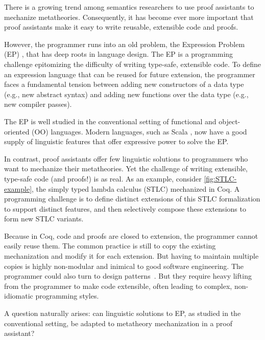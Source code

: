 
There is a growing trend among semantics researchers to
use proof assistants to mechanize meta\-theories.
Consequently, it has become ever more important that proof assistants
make it easy to write reusable, extensible code and proofs.

However, the programmer runs into an old problem,
the Expression Problem (EP) \cite{wadler-ep},
that has deep roots in language design.
%
The EP is a programming challenge
epitomizing the difficulty of writing type-safe, extensible code.
To define an expression language that can be reused for future extension,
the programmer faces a fundamental tension \cite{reynolds1975} between
adding new constructors of a data type (e.g., new abstract syntax) and
adding new functions over the data type (e.g., new compiler passes).

The EP is well studied in the conventional setting of functional and
object-oriented (OO) languages.
Modern languages, such as Scala \cite{scala-oopsla05}, now have a good
supply of linguistic features that offer expressive power to solve the
EP.

In contrast, proof assistants offer few linguistic solutions to
programmers who want to mechanize their metatheories.
Yet the challenge of writing extensible, type-safe code (and proofs!) is
as real.
As an example, consider \cref{fig:STLC-example}, the simply typed
lambda calculus (STLC) mechanized in Coq.
A programming challenge is to define distinct extensions of this STLC
formalization to support distinct features,
and then selectively compose these extensions to form new STLC variants.

Because in Coq, code and proofs are closed to extension, the programmer
cannot easily reuse them.
The common practice is still to copy the existing mechanization and
modify it for each extension.
But having to maintain multiple copies is highly non-modular and
inimical to good software engineering.
%
The programmer could also turn to design patterns~\cite{delaware2011,delaware2013}.
But they require heavy lifting from the programmer to make code
extensible, often leading to complex, non-idiomatic programming styles.

A question naturally arises: can linguistic solutions to EP, as studied
in the conventional setting, be adapted to metatheory mechanization in
a proof assistant?

